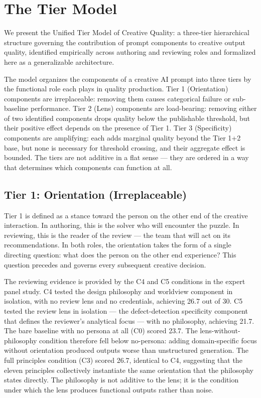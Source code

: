 \section{The Tier Model}
\label{sec:tiermodel}

We present the Unified Tier Model of Creative Quality: a three-tier hierarchical
structure governing the contribution of prompt components to creative output quality,
identified empirically across authoring and reviewing roles and formalized here as a
generalizable architecture.

The model organizes the components of a creative AI prompt into three tiers by the
functional role each plays in quality production. Tier 1 (Orientation) components are
irreplaceable: removing them causes categorical failure or sub-baseline performance.
Tier 2 (Lens) components are load-bearing: removing either of two identified
components drops quality below the publishable threshold, but their positive effect
depends on the presence of Tier 1. Tier 3 (Specificity) components are amplifying:
each adds marginal quality beyond the Tier 1+2 base, but none is necessary for
threshold crossing, and their aggregate effect is bounded. The tiers are not additive
in a flat sense --- they are ordered in a way that determines which components can
function at all.

\subsection{Tier 1: Orientation (Irreplaceable)}

Tier 1 is defined as a stance toward the person on the other end of the creative
interaction. In authoring, this is the solver who will encounter the puzzle. In
reviewing, this is the reader of the review --- the team that will act on its
recommendations. In both roles, the orientation takes the form of a single directing
question: what does the person on the other end experience? This question precedes and
governs every subsequent creative decision.

The reviewing evidence is provided by the C4 and C5 conditions in the expert panel
study. C4 tested the design philosophy and worldview component in isolation, with no
review lens and no credentials, achieving 26.7 out of 30. C5 tested the review lens
in isolation --- the defect-detection specificity component that defines the reviewer's
analytical focus --- with no philosophy, achieving 21.7. The bare baseline with no
persona at all (C0) scored 23.7. The lens-without-philosophy condition therefore fell
below no-persona: adding domain-specific focus without orientation produced outputs
worse than unstructured generation. The full principles condition (C3) scored 26.7,
identical to C4, suggesting that the eleven principles collectively instantiate the
same orientation that the philosophy states directly. The philosophy is not additive
to the lens; it is the condition under which the lens produces functional outputs
rather than noise.

